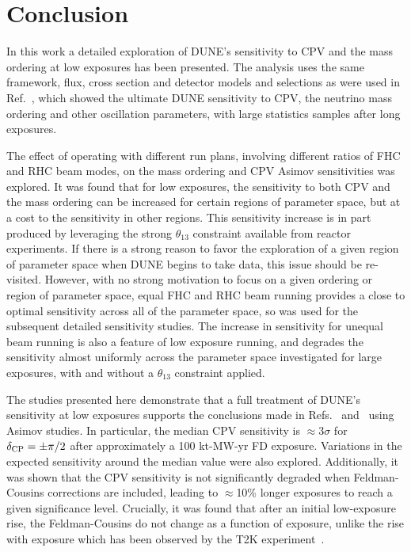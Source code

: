 \section{Conclusion}
\label{sec:conclude}

In this work a detailed exploration of DUNE's sensitivity to CPV and the mass ordering at low exposures has been presented. The analysis uses the same framework, flux, cross section and detector models and selections as were used in Ref.~\cite{Abi:2020qib}, which showed the ultimate DUNE sensitivity to CPV, the neutrino mass ordering and other oscillation parameters, with large statistics samples after long exposures.

The effect of operating with different run plans, involving different ratios of FHC and RHC beam modes, on the mass ordering and CPV Asimov sensitivities was explored. It was found that for low exposures, the sensitivity to both CPV and the mass ordering can be increased for certain regions of parameter space, but at a cost to the sensitivity in other regions. This sensitivity increase is in part produced by leveraging the strong $\theta_{13}$ constraint available from reactor experiments. If there is a strong reason to favor the exploration of a given region of parameter space when DUNE begins to take data, this issue should be re-visited. However, with no strong motivation to focus on a given ordering or region of \deltacp parameter space, equal FHC and RHC beam running provides a close to optimal sensitivity across all of the parameter space, so was used for the subsequent detailed sensitivity studies. The increase in sensitivity for unequal beam running is also a feature of low exposure running, and degrades the sensitivity almost uniformly across the parameter space investigated for large exposures, with and without a $\theta_{13}$ constraint applied.

The studies presented here demonstrate that a full treatment of DUNE's sensitivity at low exposures supports the conclusions made in Refs.~\cite{Abi:2020qib} and~\cite{Abi:2020evt} using Asimov studies. In particular, the median CPV sensitivity is $\approx$3$\sigma$ for $\delta_{\rm CP} = \pm\pi/2$ after approximately a 100 kt-MW-yr FD exposure. Variations in the expected sensitivity around the median value were also explored. Additionally, it was shown that the CPV sensitivity is not significantly degraded when Feldman-Cousins corrections are included, leading to $\approx$10\% longer exposures to reach a given significance level. Crucially, it was found that after an initial low-exposure rise, the Feldman-Cousins \dchisqcrit do not change as a function of exposure, unlike the rise with exposure which has been observed by the T2K experiment~\cite{Abe:2021gky}.

